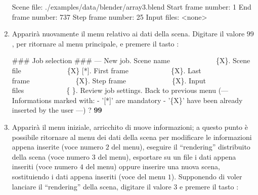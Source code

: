 \begin{enumerate}
\begin{mgCodeBox}
Scene file: ./examples/data/blender/array3.blend\newline
Start frame number: 1\newline
End frame number: 737\newline
Step frame number: 25\newline
Input files:  <none>\newline
\end{mgCodeBox}
\item Apparir\`a nuovamente il menu relativo ai dati della scena. Digitare il valore $99$, per ritornare al menu principale, e premere il tasto :
\begin{mgCodeBox}
\small
\#\#\# Job selection \#\#\#\newline
--- New job. Scene name\ \ \ \ \ \ \ \ \ \ \ \ \ \{X\}. Scene file\ \ \ \ \ \ \ \ \ \ \ \ \ \{X\} [*]. First frame\ \ \ \ \ \ \ \ \ \ \ \ \{X\}. Last frame\ \ \ \ \ \ \ \ \ \ \ \ \ \{X\}. Step frame\ \ \ \ \ \ \ \ \ \ \ \ \ \{X\}. Input files\ \ \ \ \ \ \ \ \ \ \ \ \{ \}. Review job settings. Back to previous menu\newline
(---\newline
 Informations marked with:\newline
 - '[*]' are mandatory\newline
 - '\{X\}' have been already inserted by the user\newline
---)\newline
? \textbf{99}
\end{mgCodeBox}
\item Apparir\`a il menu iniziale, arricchito di nuove informazioni; a questo punto \`e possibile ritornare al menu dei dati della scena per modificare le informazioni appena inserite (voce numero $2$ del menu), eseguire il ``rendering'' distribuito della scena (voce numero $3$ del menu), esportare su un file i dati appena inseriti (voce numero $4$ del menu) oppure inserire una nuova scena, sostituiendo i dati appena inseriti (voce del menu $1$).
Supponendo di voler lanciare il ``rendering'' della scena, digitare il valore $3$ e premere il tasto :
\begin{mgCodeBox}

\end{mgCodeBox}
\end{enumerate}
